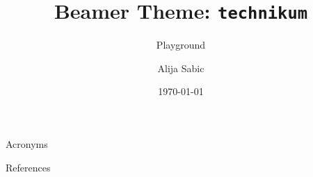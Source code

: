 \documentclass[aspectratio=169]{beamer}
\title{Beamer Theme: \texttt{technikum}}
\subtitle{Playground}
\author[Sabic]{Alija Sabic}
\institute{Electronic Engineering \& Entrepreneurship}
\date{\today}
\begin{document}
\begin{frame}
    \titlepage
\end{frame}

\begin{frame}
\end{frame}

\appendix

\begin{frame}[allowframebreaks]{Acronyms}
    \printglossary[type=\acronymtype, nonumberlist]
\end{frame}

\begin{frame}[allowframebreaks]{References}
    \label{references}
    
\end{frame}
\end{document}
